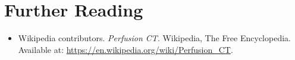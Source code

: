 \section{Further Reading}
\begin{itemize}
  \item Wikipedia contributors. \textit{Perfusion CT}. Wikipedia, The Free Encyclopedia. Available at: \url{https://en.wikipedia.org/wiki/Perfusion_CT}.
\end{itemize}

